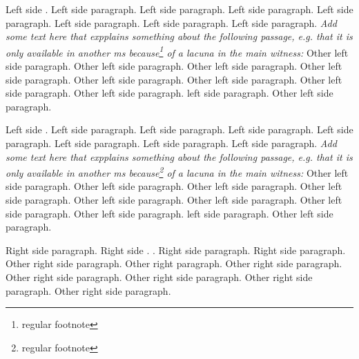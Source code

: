 \documentclass{book}
\begin{document}

\beginnumbering
	       \pstart
                Left side %
%
. Left side paragraph. Left side paragraph. Left side paragraph. Left side paragraph. Left side paragraph. Left side paragraph. Left side paragraph.
            \pend
            \numberlinefalse
            \pstart
\textit{Add some text here that expplains something about the following passage, e.g. that it is only available in another ms because\footnote{regular footnote} of a lacuna in the main witness:            
}           \pend
			\numberlinetrue
            \pstart
                Other left side paragraph.  Other left side paragraph.  Other left side paragraph.  Other left side paragraph.  Other left side paragraph.  Other left side paragraph.  Other left side paragraph.  Other left side paragraph.  %
 left side paragraph.  Other left side paragraph.
            \pend
\endnumbering



\begin{pages}
    \begin{Leftside}
        \beginnumbering
            \pstart
                Left side %
%
. Left side paragraph. Left side paragraph. Left side paragraph. Left side paragraph. Left side paragraph. Left side paragraph. Left side paragraph.
            \pend
            \numberlinefalse
            \pstart
\textit{Add some text here that expplains something about the following passage, e.g. that it is only available in another ms because\footnote{regular footnote} of a lacuna in the main witness:            
}           \pend
			\numberlinetrue
            \pstart
                Other left side paragraph.  Other left side paragraph.  Other left side paragraph.  Other left side paragraph.  Other left side paragraph.  Other left side paragraph.  Other left side paragraph.  Other left side paragraph.  %
 left side paragraph.  Other left side paragraph.
            \pend
        \endnumbering
    \end{Leftside}
    \begin{Rightside}
        \beginnumbering
            \pstart
                Right side paragraph. Right side %
.
. Right side paragraph. Right side paragraph.
            \pend
            \numberlinefalse
            \pstart
            \pend
            \numberlinetrue
            \pstart
                Other right side paragraph. Other right %
 paragraph. Other right side paragraph. Other right side paragraph. Other right side paragraph. Other right side paragraph. Other right side paragraph.
            \pend
        \endnumbering
    \end{Rightside}

\end{pages} 
\Pages
\end{document}
